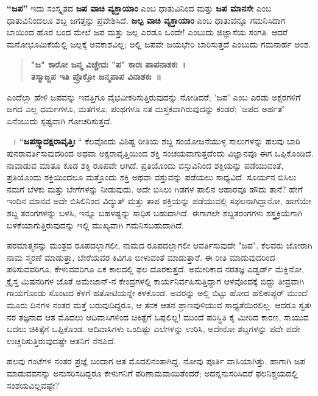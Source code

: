 {\textbf{“ಜಪ”} ಇದು ಸಂಸ್ಕೃತದ \textbf{ಜಪ ವಾಚಿ ವ್ಯಕ್ತಾಯಾಂ} ಎಂಬ ಧಾತುವಿನಿಂದ ಮತ್ತು \textbf{ಜಪ ಮಾನಸೇ} ಎಂಬ ಧಾತುವಿನಿಂದಲೂ ಶಬ್ದ ಜಗತ್ತನ್ನು ಪ್ರವೇಶಿಸಿದೆ. \textbf{ಜಲ್ಪ ವಾಚಿ ವ್ಯಕ್ತಾಯಾಂ} ಎಂಬ ಧಾತುವನ್ನೂ ಗಮನಿಸಿದಾಗ ಬಾಯಿಂದ ಹೊರ ಬಂದ ಮೇಲೆ ಜಪ ಮತ್ತು ಜಲ್ಪ ಎರಡೂ ಒಂದೇ! ಎಂಬುದು ಜಿಜ್ಞಾಸೆಯ ಸಂಗತಿ. ಆದರೆ ಮನೋಭೂಮಿಕೆಯೆಲ್ಲಿ ಜಲ್ಪಕ್ಕೆ ಅವಕಾಶವಿಲ್ಲ; ಅಲ್ಲಿ ಜಪವೇ ಜಯಭೇರಿ ಬಾರಿಸುತ್ತದೆ ಎಂಬುದು ಗಮನಾರ್ಹ ಅಂಶ.
\begin{verse}
\textbf{"ಜ" ಕಾರೋ ಜನ್ಮ ವಿಚ್ಚೇದಃ "ಪ" ಕಾರಃ ಪಾಪನಾಶಕಃ~। \\
ತಸ್ಮಾಜ್ಜಪ ಇತಿ ಪ್ರೊಕ್ತೋ ಜನ್ಮಪಾಪ ವಿನಾಶಕಃ~॥}
\end{verse}
ಎಂದೆಲ್ಲಾ ಹೇಳಿ ಜಪವನ್ನು ಇವತ್ತಿಗೂ ವೈಭವೀಕರಿಸುತ್ತಿರುವುದನ್ನು ನೋಡಿದರೆ; ’ಜಪ’ ಎಂಬ ಎರಡು ಅಕ್ಷರಗಳಿಗೆ ಜಗದ ಎಲ್ಲ ಧರ್ಮಗಳೂ, ಮತಗಳೂ, ಪಂಥಗಳೂ ನತ ಮಸ್ತಕವಾಗಿರುವುದನ್ನು ಕಂಡರೆ; ’ಜಪದ ಅರ್ಹತೆ’ ಏನೆಂಬುದು ಸ್ಪಷ್ಟವಾಗಿ ಗೋಚರಿಸುತ್ತದೆ.

~। “\textbf{ಜಪಸ್ಸ್ಯಾದಕ್ಷರಾವೃತ್ತಿಃ} “ ಕೆಲವೊಂದು ವಿಶಿಷ್ಟ ರೀತಿಯ ಶಬ್ದ ಸಂಯೋಜನೆಯುಳ್ಳ ಸಾಲುಗಳನ್ನು ಹಲವು ಬಾರಿ ಪುನರಾವರ್ತಿಸುವುದರಿಂದ ಅಥವಾ ಅಕ್ಷರಾವೃತ್ತಿಯಿಂದ ಶಕ್ತಿ ಸಂಚಯವಾಗುತ್ತದೆಂದು ವಿಜ್ಞಾನವೂ ಈಗ ಒಪ್ಪಿಕೊಂಡಿದೆ. ನಾವಾಡುವ ಮಾತೂ ಕೂಡ ಶಕ್ತಿ ರೂಪವೇ ಆಗಿದೆ. ಪ್ರತಿಯೊಂದು ವಸ್ತುವಿನಿಂದ ಶಕ್ತಿಯನ್ನು ಪಡೆಯುವಂತೆ, ಪ್ರತಿಯೊಂದು ಶಕ್ತಿಯಿಂದಲೂ ಮತ್ತೊಂದು ಶಕ್ತಿ ಅಥವಾ ವಸ್ತುವನ್ನು ಪಡೆಯಲು ಸಾಧ್ಯವಿದೆ. ಸೂರ್ಯನ ಬಿಸಿಲು ನಮಗೆ ಬೆಳಕು ಮತ್ತು ಬೇಗೆಗಳನ್ನು ನೀಡುವುದು. ಅದೇ ಬಿಸಿಲು ಗಿಡಗಳ ಪಾಲಿನ ಆಹಾರವೂ ಹೌದು ತಾನೆ? ಹೇಗೆ ಇಂದಿನ ಮಾನವ ಅದೇ ಬಿಸಿಲಿನಿಂದ ವಿದ್ಯುತ್ ಮತ್ತು ತಾಪ ಶಕ್ತಿಯನ್ನು ಪಡೆಯುವಲ್ಲಿ ಸಫಲನಾಗಿದ್ದಾನೋ, ಹಾಗೆಯೇ ಶಬ್ದ ತರಂಗಗಳನ್ನು ಬಳಸಿ, ಇನ್ನೂ ಬಹಳಷ್ಟನ್ನು ಸಾಧಿಸ ಬಹುದಾಗಿದೆ. ಈಗಾಗಲೇ ಶಬ್ದತರಂಗಗಳು ಶಸ್ತ್ರಕ್ರಿಯೆಗಾಗಿ ಬಳಕೆಯಾಗುತ್ತಿರುವುದನ್ನು ಇಲ್ಲಿ ಮುಖ್ಯವಾಗಿ ಗಮನಿಸಬಹುದಾಗಿದೆ.

ಪರಮಾತ್ಮನನ್ನು ಮಂತ್ರದ ರೂಪದಲ್ಲಾಗಲೀ, ನಾಮದ ರೂಪದಲ್ಲಾಗಲೀ ಆವರ್ತಿಸುವುದೇ "ಜಪ". ಕೆಲವರು ಜೋರಾಗಿ ನಾಮ ಸ್ಮರಣೆ ಮಾಡುತ್ತಾ, ಬೇರೆಯವರ ಕಿವಿಗೂ ಬೀಳುವಂತೆ ಮಾಡುತ್ತಾರೆ. ಈ ರೀತಿ ಮಾಡುವುದರಿಂದ ಪಠಿಸುವವರಿಗೂ, ಕೇಳುವವರಿಗೂ ಏಕ ಕಾಲದಲ್ಲಿ ಫಲ ದೊರಕುತ್ತದೆ. ಅಮೇರಿಕಾದ ನರತಜ್ಞ ಎಡ್ವರ್ಡ್ ಮೆಕ್ಲಿನೋ, ಕ್ರೈಸ್ತ ಮಿಷನರಿಗಳ ಜೊತೆ ಅಮೇಜಾನ್-ನ ಕೇಂದ್ರಗಳಲ್ಲಿ ಕಾರ್ಯನಿರ್ವಹಿಸುತ್ತಿದ್ದಾಗ ಆಳವೊಂದಕ್ಕೆ ಬಿದ್ದು ತೀವ್ರವಾಗಿ ಗಾಯಗೊಂಡು ಸೊಂಟದ ಕೆಳಗೆ ಹತೋಟಿಯನ್ನೇ ಕಳಕೊಂಡ. ಅವರನ್ನು ಅಲ್ಲಿ ಬಿಟ್ಟು ಹೋದ ಹೆಲಿಕಾಪ್ಟರ್ ಮುಂದೆ ಮೂರು ದಿನಗಳ ನಂತರ ಮತ್ತೆ ಬರುವುದಿದ್ದರೂ, ಆ ತನಕ ಆತನ ಪ್ರಾಣವುಳಿಯುವ ಸಾಧ್ಯತೆಯಿರಲಿಲ್ಲ. ಆದರೂ ಸ್ವತಃ ನರ ತಜ್ಞನಾದ ಆತ ಮೊದಲು ಆದಿವಾಸಿಗಳಿಂದ ಚಿಕಿತ್ಸೆಗೆ ಒಪ್ಪಲಿಲ್ಲ! ಮುಂದೆ ಪರಿಸ್ಥಿತಿ ಕೈ ಮೀರಿದ ಕಾರಣ, ಸಾಯುವ ಬದಲು ಚಿಕಿತ್ಸೆಗೆ ಒಪ್ಪಿಕೊಂಡ. ಆದಿವಾಸಿಗಳು ಒಂದಿಷ್ಟು ಎಲೆಗಳನ್ನು ಉರಿಸಿ, ಅದೇನೋ ಶಬ್ದಗಳನ್ನು ಪದೇ ಪದೇ ಉಚ್ಚರಿಸುತ್ತಿರುವುದಷ್ಟೇ ಆತನಿಗೆ ನೆನಪಿದೆ. 

ಹಲವು ಗಂಟೆಗಳ ನಂತರ ಪ್ರಜ್ಞೆ ಬಂದಾಗ ಆತ ಮೊದಲಿನಂತಾಗಿದ್ದ. ನೋವು ಪೂರ್ತಿ ವಾಸಿಯಾಗಿತ್ತು. ಹಾಗಾಗಿ ಜಪ ಮಾಡುವವನನ್ನು ಅನುಸರಿಸದಿದ್ದರೂ ಕೇಳುಗನಿಗೆ ಪರಿಣಾಮವಾಯಿತೆಂದರೆ; ಅದನ್ನನುಸರಿಸಿದರೆ ಫಲನಿಶ್ಚಯದಲ್ಲಿ ಸಂಶಯವಿಲ್ಲವಷ್ಟೇ?

}
